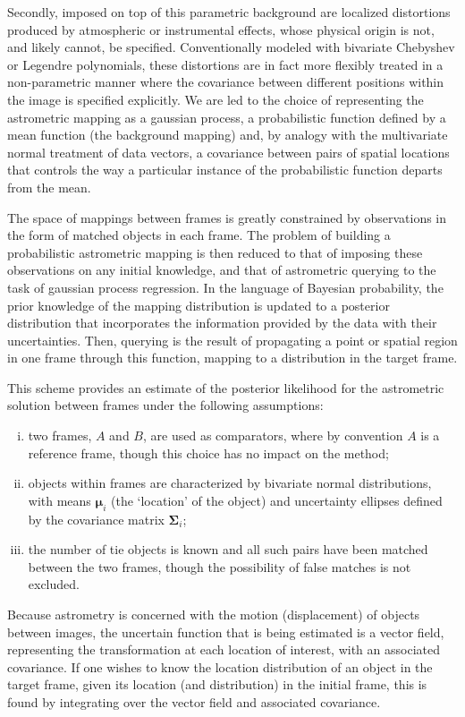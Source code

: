\documentclass[manuscript]{aastex}
\newcommand{\bsS}{\boldsymbol\Sigma}
\begin{document}
Secondly, imposed on top of this  parametric background are localized distortions produced by atmospheric or instrumental effects, whose physical origin is not, and likely cannot, be specified. Conventionally modeled with bivariate Chebyshev or Legendre polynomials, these distortions are in fact more flexibly treated in a non-parametric manner where the covariance between different positions within the image is specified explicitly. We are led to the choice of representing the astrometric mapping as a gaussian process, a probabilistic function defined by a mean function (the background mapping) and, by analogy with the multivariate normal treatment of data vectors, a covariance between pairs of spatial locations that controls the way a particular instance of the probabilistic function departs from the mean.

The space of mappings between frames is greatly constrained by observations in the form of matched objects in each frame. The problem of building a probabilistic astrometric mapping is then reduced to that of imposing these observations on any initial knowledge, and that of astrometric querying to the task of gaussian process regression. In the language of Bayesian probability, the prior knowledge of the mapping distribution is updated to a posterior distribution that incorporates the information provided by the data with their uncertainties. Then, querying is the result of propagating a point or spatial region in one frame through this function, mapping to a distribution in the target frame. 

This scheme provides an estimate of the posterior likelihood  for the astrometric solution between frames under the following assumptions: 
\begin{enumerate}[(i)]
\item two frames, $A$ and $B$, are used as comparators, where by convention $A$ is a reference frame, though this choice has no impact on the method;
\item objects within frames are characterized by bivariate normal distributions, with means $\boldsymbol\mu_i$ (the `location' of the object) and uncertainty ellipses defined by the covariance matrix $\boldsymbol\Sigma_i$;
\item the number of tie objects is known and all such pairs have been matched between the two frames, though the possibility of false matches is not excluded.
\end{enumerate}

Because astrometry is concerned with the motion (displacement) of objects between images, the uncertain function that is being estimated is a vector field, representing the transformation at each location of interest, with an associated covariance. If one wishes to know the location distribution of an object in the target frame, given its location (and distribution) in the initial frame, this is found by integrating over the vector field and associated covariance. %
\end{document}
